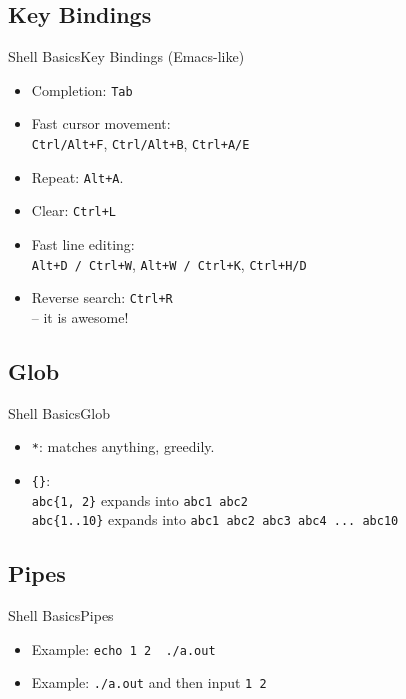 \documentclass[aspectratio=169]{beamer}
\begin{document}
\subsection{Key Bindings}
\begin{frame}{Shell Basics}{Key Bindings (Emacs-like)}

\begin{itemize}[<+->]
\item
  Completion: \texttt{Tab}
\item
  Fast cursor movement:\\
  \texttt{Ctrl/Alt+F}, \texttt{Ctrl/Alt+B}, \texttt{Ctrl+A/E}
\item
  Repeat: \texttt{Alt+A}.
\item
  Clear: \texttt{Ctrl+L}
\item
  Fast line editing:\\
  \texttt{Alt+D\ /\ Ctrl+W}, \texttt{Alt+W\ /\ Ctrl+K},
  \texttt{Ctrl+H/D}
\item
  Reverse search: \texttt{Ctrl+R}\\
  -- it is awesome!
\end{itemize}

\end{frame}

\subsection{Glob}
\begin{frame}{Shell Basics}{Glob}

\begin{itemize}[<+->]
\item
  \texttt{*}: matches anything, greedily.
\item
  \texttt{\{\}}:\\
  \texttt{abc\{1,\ 2\}} expands into \texttt{abc1\ abc2}\\
  \texttt{abc\{1..10\}} expands into
  \texttt{abc1\ abc2\ abc3\ abc4\ ...\ abc10}
\end{itemize}

\end{frame}

\subsection{Pipes}
\begin{frame}{Shell Basics}{Pipes}

\begin{itemize}
\item
  Example: \texttt{echo\ 1\ 2\ \textbar{}\ ./a.out}
\item
  Example: \texttt{./a.out} and then input \texttt{1\ 2}
\end{itemize}

\end{frame}
\end{document}
